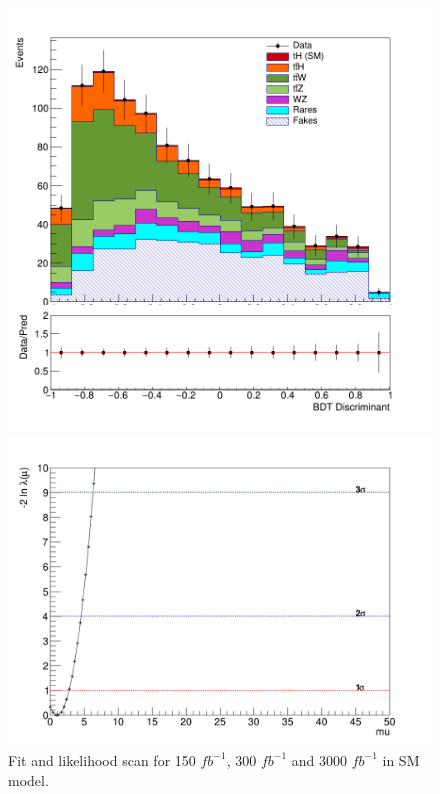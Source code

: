 \begin{linenumbers}
\begin{figure}[!htbp]
\begin{minipage}[b]{0.48\textwidth}
		\includegraphics[width=\textwidth]{Chapter4/3000fb/simple-3000.png}
	\end{minipage}
	\hfill
	\begin{minipage}[b]{0.48\textwidth}
		\includegraphics[width=\textwidth]{Chapter4/3000fb/Likelihood.png}
	\end{minipage}
	\caption{Fit and likelihood scan for 150 $fb^{-1}$, 300 $fb^{-1}$ and 3000 $fb^{-1}$ in SM model.}
	\label{hm}
\end{figure}
\pagebreak


\end{linenumbers}
